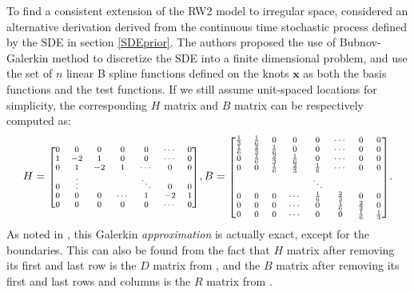 \documentclass{article}
\begin{document}
To find a consistent extension of the RW2 model to irregular space, \citep{rw2} considered an alternative derivation derived from the continuous time stochastic process defined by the SDE in section \ref{SDEprior}. The authors proposed the use of Bubnov-Galerkin method to discretize the SDE into a finite dimensional problem, and use the set of $n$ linear B spline functions defined on the knots $\boldsymbol{x}$ as both the basis functions and the test functions. If we still assume unit-spaced locations for simplicity, the corresponding $H$ matrix and $B$ matrix can be respectively computed as:
\begin{equation}\label{HandB}
\begin{aligned}
H = \mbox{\scriptsize $\begin{bmatrix}
0 & 0 & 0 & 0 & 0 & \cdots & 0\\
1 & -2 & 1 & 0 & 0 & \cdots & 0\\
0 & 1 & -2 & 1 & \cdots & 0 & 0\\
0 & \vdots &  &  & \ddots & 0 & 0\\
0 & 0 & 0 & \cdots & 1 & -2 & 1\\
0 & 0 & 0 & 0 & 0 & \cdots & 0\\
\end{bmatrix}$},
B = \mbox{\scriptsize $\begin{bmatrix}
\frac{1}{3} & \frac{1}{6} & 0 & 0 & 0 & \cdots & 0 & 0\\
\frac{1}{6} & \frac{2}{3} & \frac{1}{6} & 0 & 0 & \cdots & 0 & 0\\
0 & \frac{1}{6} & \frac{2}{3} & \frac{1}{6} & 0 & \cdots & 0 & 0\\
0 & 0 & \frac{1}{6} & \frac{2}{3} & \frac{1}{6} & \cdots & 0 & 0\\
 &  &  &  & \ddots &  & & \\
 0 & 0 & 0 & \cdots & \frac{1}{6} & \frac{2}{3} & 0 & 0\\
0 & 0 & 0 & \cdots & 0 & \frac{1}{6} & \frac{2}{3} & 0\\
0 & 0 & 0 & \cdots & 0 & 0 & \frac{1}{6} & \frac{1}{3} \\
\end{bmatrix}$}.
\end{aligned}
\end{equation}
As noted in \cite{rw2}, this Galerkin \textit{approximation} is actually exact, except for the boundaries. This can also be found from the fact that $H$ matrix after removing its first and last row is the $D$ matrix from \cite{ARIMA}, and the $B$ matrix after removing its first and last rows and columns is the $R$ matrix from \cite{ARIMA}.
\end{document}
